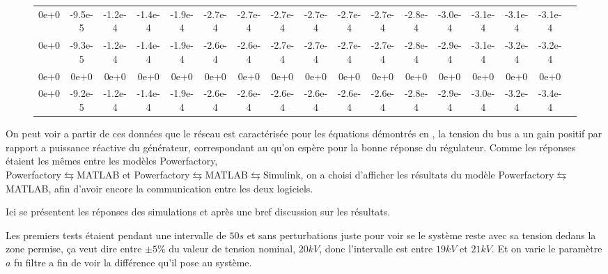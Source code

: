 \begin{sidewaysfigure}
\begin{table}[H]
{\begin{tabular}{ccccccccccccccccc}
				0e+0& -9.5e-5& -1.2e-4& -1.4e-4& -1.9e-4& -2.7e-4& -2.7e-4& -2.7e-4& -2.7e-4& -2.7e-4& -2.7e-4& -2.8e-4& -3.0e-4& -3.1e-4& -3.1e-4& -3.1e-4\\
				0e+0& -9.3e-5& -1.2e-4& -1.4e-4& -1.9e-4& -2.6e-4& -2.6e-4& -2.7e-4& -2.7e-4& -2.7e-4& -2.7e-4& -2.8e-4& -2.9e-4& -3.1e-4& -3.2e-4& -3.2e-4\\
				0e+0& 0e+0& 0e+0& 0e+0& 0e+0& 0e+0& 0e+0& 0e+0& 0e+0& 0e+0& 0e+0& 0e+0& 0e+0& 0e+0& 0e+0& 0e+0\\
				0e+0& -9.2e-5& -1.2e-4& -1.4e-4& -1.9e-4& -2.6e-4& -2.6e-4& -2.6e-4& -2.6e-4& -2.6e-4& -2.6e-4& -2.8e-4& -2.9e-4& -3.0e-4& -3.2e-4& -3.4e-4
				\\
		\end{tabular}}
	\end{table} 
	
\end{sidewaysfigure}
\vspace{2em}
On peut voir a partir de ces données que le réseau est caractérisée pour les équations démontrés en \cite{cosson:tel-01374469}, la tension du bus a un gain positif par rapport a puissance réactive du générateur, correspondant au qu'on espère pour la bonne réponse du régulateur.
\newpage
{}
Comme les réponses étaient les mêmes entre les modèles Powerfactory,\\ Powerfactory$ \leftrightarrows $MATLAB et Powerfactory$ \leftrightarrows $MATLAB$ \leftrightarrows $Simulink, on a choisi d'afficher les résultats du modèle Powerfactory$ \leftrightarrows $MATLAB, afin d'avoir encore la communication entre les deux logiciels.

 Ici se présentent les réponses des simulations et après une bref discussion sur les résultats.
 
 Les premiers tests étaient pendant une intervalle de $ 50s $ et sans perturbations juste pour voir se le système reste avec sa tension dedans la zone permise, ça veut dire entre $ \pm 5\% $ du valeur de tension nominal, $ 20kV $, donc l'intervalle est entre $ 19kV $ et $ 21kV $. Et on varie le paramètre $ a $ fu filtre a fin de voir la différence qu'il pose au système.
 
